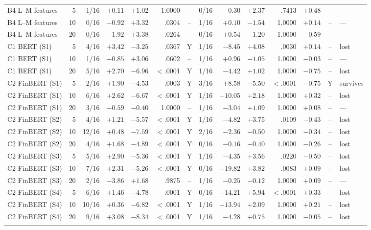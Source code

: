 \begin{table}[p]
\begin{tabular}{@{}lrrrrrcrrrrrcl@{}}
\addlinespace
B4 L--M features&5&1/16&$+0.11$&$+1.02$& 1.0000 &--&0/16&$-0.30$&$+2.37$& .7413 &$+0.48$&--&---\\
B4 L--M features&10&0/16&$-0.92$&$+3.32$& .0304 &--&1/16&$+0.10$&$-1.54$& 1.0000 &$+0.14$&--&---\\
B4 L--M features&20&0/16&$-1.92$&$+3.38$& .0264 &--&0/16&$+0.54$&$-1.20$& 1.0000 &$-0.59$&--&---\\
\addlinespace
C1 BERT (S1)&5&4/16&$+3.42$&$-3.25$& .0367 &Y&1/16&$-8.45$&$+4.08$& .0030 &$+0.14$&--&lost\\
C1 BERT (S1)&10&1/16&$-0.85$&$+3.06$& .0602 &--&1/16&$+0.96$&$-1.05$& 1.0000 &$-0.03$&--&---\\
C1 BERT (S1)&20&5/16&$+2.70$&$-6.96$& $<$.0001 &Y&1/16&$-4.42$&$+1.02$& 1.0000 &$-0.75$&--&lost\\
\addlinespace
C2 FinBERT (S1)&5&2/16&$+1.90$&$-4.53$& .0003 &Y&3/16&$+8.58$&$-5.50$& $<$.0001 &$-0.75$&Y&survives\\
C2 FinBERT (S1)&10&6/16&$+2.62$&$-6.67$& $<$.0001 &Y&1/16&$-10.05$&$+2.18$& 1.0000 &$+0.32$&--&lost\\
C2 FinBERT (S1)&20&3/16&$-0.59$&$-0.40$& 1.0000 &--&1/16&$-3.04$&$+1.09$& 1.0000 &$+0.08$&--&---\\
\addlinespace
C2 FinBERT (S2)&5&4/16&$+1.21$&$-5.57$& $<$.0001 &Y&1/16&$-4.82$&$+3.75$& .0109 &$-0.43$&--&lost\\
C2 FinBERT (S2)&10&12/16&$+0.48$&$-7.59$& $<$.0001 &Y&2/16&$-2.36$&$-0.50$& 1.0000 &$-0.34$&--&lost\\
C2 FinBERT (S2)&20&4/16&$+1.68$&$-4.89$& $<$.0001 &Y&0/16&$-0.16$&$-0.40$& 1.0000 &$-0.26$&--&lost\\
\addlinespace
C2 FinBERT (S3)&5&5/16&$+2.90$&$-5.36$& $<$.0001 &Y&1/16&$-4.35$&$+3.56$& .0220 &$-0.50$&--&lost\\
C2 FinBERT (S3)&10&7/16&$+2.31$&$-5.26$& $<$.0001 &Y&0/16&$-19.82$&$+3.82$& .0083 &$+0.09$&--&lost\\
C2 FinBERT (S3)&20&2/16&$-3.86$&$+1.68$& .9875 &--&1/16&$-0.25$&$-0.12$& 1.0000 &$+0.09$&--&---\\
\addlinespace
C2 FinBERT (S4)&5&6/16&$+1.46$&$-4.78$& .0001 &Y&0/16&$-14.21$&$+5.94$& $<$.0001 &$+0.33$&--&lost\\
C2 FinBERT (S4)&10&10/16&$+0.36$&$-6.82$& $<$.0001 &Y&1/16&$-13.94$&$+2.09$& 1.0000 &$+0.21$&--&lost\\
C2 FinBERT (S4)&20&9/16&$+3.08$&$-8.34$& $<$.0001 &Y&1/16&$-4.28$&$+0.75$& 1.0000 &$-0.05$&--&lost\\
\addlinespace

\end{tabular}
\end{table}
